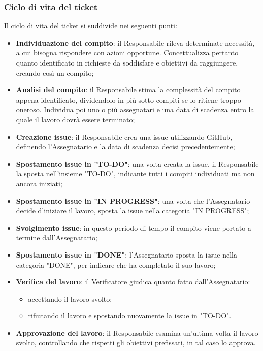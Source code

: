 \subsubsection{Ciclo di vita del ticket}
Il ciclo di vita del ticket si suddivide nei seguenti punti:
\begin {itemize}
\item \textbf{Individuazione del compito}: il Responsabile rileva determinate necessità, a cui bisogna rispondere con azioni opportune. Concettualizza pertanto quanto identificato in richieste da soddisfare e obiettivi da raggiungere, creando così un compito;
\item \textbf{Analisi del compito}: il Responsabile stima la complessità del compito appena identificato, dividendolo in più sotto-compiti se lo ritiene troppo oneroso. Individua poi uno o più assegnatari e una data di scadenza entro la quale il lavoro dovrà essere terminato;
\item \textbf{Creazione issue}: il Responsabile crea una issue utilizzando GitHub, definendo l’Assegnatario e la data di scadenza decisi precedentemente;
\item \textbf{Spostamento issue in "TO-DO"}: una volta creata la issue, il Responsabile la sposta nell’insieme "TO-DO", indicante tutti i compiti individuati ma non ancora iniziati;
\item \textbf{Spostamento issue in "IN PROGRESS"}: una volta che l’Assegnatario decide d'iniziare il lavoro, sposta la issue nella categoria "IN PROGRESS";
\item \textbf{Svolgimento issue}: in questo periodo di tempo il compito viene portato a termine dall'Assegnatario;
\item \textbf{Spostamento issue in "DONE"}: l’Assegnatario sposta la issue nella categoria "DONE", per indicare che ha completato il suo lavoro;
\item \textbf{Verifica del lavoro}: il Verificatore giudica quanto fatto dall’Assegnatario:
\begin {itemize}
\item accettando il lavoro svolto;
\item rifiutando il lavoro e spostando nuovamente la issue in "TO-DO".
\end {itemize}
\item \textbf{Approvazione del lavoro}: il Responsabile esamina un’ultima volta il lavoro svolto, controllando che rispetti gli obiettivi prefissati, in tal caso lo approva.
\end {itemize}
